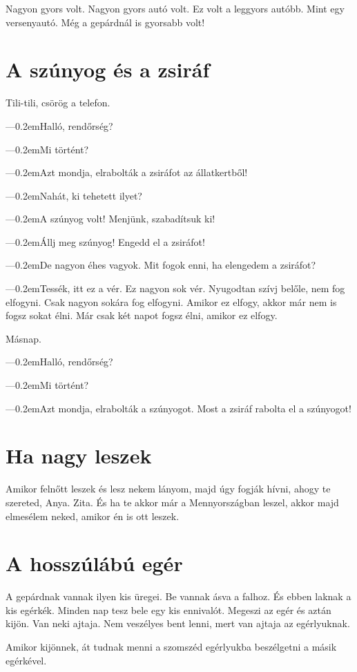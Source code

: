 \documentclass[12pt]{memoir}
\def\dash{---\kern 0.2em}
\begin{document}
Nagyon gyors volt. Nagyon gyors autó volt. Ez volt a leggyors autóbb. Mint egy
versenyautó. Még a gepárdnál is gyorsabb volt!


\section*{A szúnyog és a zsiráf}
Tili-tili, csörög a telefon.

\dash Halló, rendőrség?

\dash Mi történt?

\dash Azt mondja, elrabolták a zsiráfot az állatkertből!

\dash Nahát, ki tehetett ilyet?

\dash A szúnyog volt! Menjünk, szabadítsuk ki!

\dash Állj meg szúnyog! Engedd el a zsiráfot!

\dash De nagyon éhes vagyok. Mit fogok enni, ha elengedem a zsiráfot?

\dash Tessék, itt ez a vér. Ez nagyon sok vér. Nyugodtan szívj belőle, nem fog
elfogyni. Csak nagyon sokára fog elfogyni. Amikor ez elfogy, akkor már nem is
fogsz sokat élni. Már csak két napot fogsz élni, amikor ez elfogy.

\bigskip

Másnap.

\dash Halló, rendőrség?

\dash Mi történt?

\dash Azt mondja, elrabolták a szúnyogot. Most a zsiráf rabolta el a szúnyogot!


\section*{Ha nagy leszek}
Amikor felnőtt leszek és lesz nekem lányom, majd úgy fogják hívni, ahogy te
szereted, Anya. Zita. És ha te akkor már a Mennyországban leszel, akkor majd
elmesélem neked, amikor én is ott leszek.


\section*{A hosszúlábú egér}
A gepárdnak vannak ilyen kis üregei. Be vannak ásva a falhoz. És ebben laknak a
kis egérkék. Minden nap tesz bele egy kis ennivalót. Megeszi az egér és aztán
kijön. Van neki ajtaja. Nem veszélyes bent lenni, mert van ajtaja az
egérlyuknak.

Amikor kijönnek, át tudnak menni a szomszéd egérlyukba beszélgetni a másik
egérkével.
\end{document}
